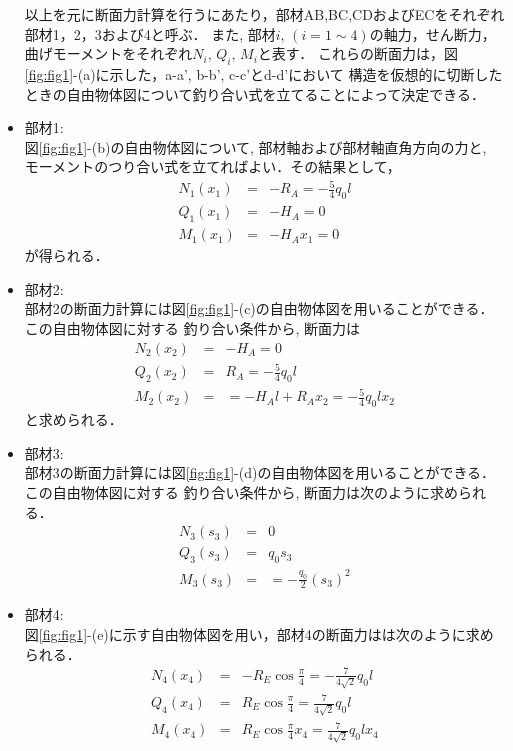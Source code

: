\documentclass[10pt,a4j]{jarticle}
\begin{document}
\begin{itemize}
	以上を元に断面力計算を行うにあたり，部材AB,BC,CDおよびECをそれぞれ部材1，2，3および4と呼ぶ．
	また, 部材$i,\,(i=1\sim 4)$の軸力，せん断力，曲げモーメントをそれぞれ$N_i, \, Q_i,\, M_i$と表す．
	これらの断面力は，図\ref{fig:fig1}-(a)に示した，a-a', b-b', c-c'とd-d'において
	構造を仮想的に切断したときの自由物体図について釣り合い式を立てることによって決定できる．
\item
	{\rm 部材1:} \\
	図\ref{fig:fig1}-(b)の自由物体図について, 部材軸および部材軸直角方向の力と, 
	モーメントのつり合い式を立てればよい．その結果として，
	\begin{eqnarray}
		N_1(x_1) & =& -R_A=-\frac{5}{4}q_0l \\
		Q_1(x_1) & =& -H_A=0\\
		M_1(x_1) & =& -H_Ax_1=0
	\end{eqnarray}
	が得られる．
\item
	{\rm 部材2:} \\
	部材2の断面力計算には図\ref{fig:fig1}-(c)の自由物体図を用いることができる．この自由物体図に対する
	釣り合い条件から, 断面力は
	\begin{eqnarray}
		N_2(x_2) 
			&=& 
			-H_A=0\\
		Q_2(x_2) 
			&=&
			R_A= -\frac{5}{4}q_0l \\
		M_2(x_2) 
			&=&
			=-H_Al+R_Ax_2
			=-\frac{5}{4}q_0lx_2
	\end{eqnarray}
	と求められる．
\item
	{\rm 部材3:} \\
	部材3の断面力計算には図\ref{fig:fig1}-(d)の自由物体図を用いることができる．この自由物体図に対する
	釣り合い条件から, 断面力は次のように求められる．
	\begin{eqnarray}
		N_3(s_3) 
			&=&  0 \\
		Q_3(s_3) 
			&=&
			q_0s_3 \\
		M_3(s_3) 
			&=&
			=-\frac{q_0}{2}(s_3)^2
	\end{eqnarray}
\item
	{\rm 部材4:} \\
	図\ref{fig:fig1}-(e)に示す自由物体図を用い，部材4の断面力はは次のように求められる．
	\begin{eqnarray}
		N_4(x_4) 
			&=&  -R_E\cos\frac{\pi}{4}=-\frac{7}{4\sqrt{2}}q_0l \\
		Q_4(x_4) 
			&=&  R_E\cos\frac{\pi}{4}=\frac{7}{4\sqrt{2}}q_0l \\
		M_4(x_4) 
			&=&  R_E\cos\frac{\pi}{4}x_4 =\frac{7}{4\sqrt{2}}q_0lx_4 
	\end{eqnarray}
\end{itemize}
\end{document}
